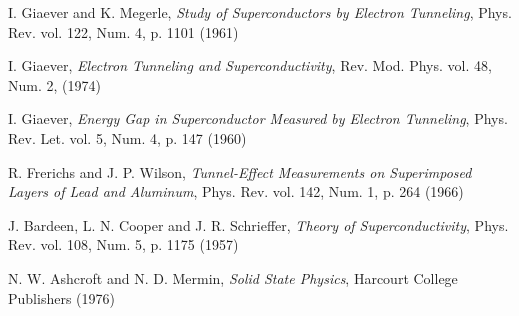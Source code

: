 \documentclass[twocolumn,a4paper,10pt]{article}
\begin{document}
\begin{thebibliography}{99}

 I. Giaever and K. Megerle, \emph{Study of Superconductors by Electron Tunneling}, Phys. Rev. vol. 122, Num. 4, p. 1101 (1961)

 I. Giaever, \emph{Electron Tunneling and Superconductivity}, Rev. Mod. Phys. vol. 48, Num. 2, (1974)

 I. Giaever, \emph{Energy Gap in Superconductor Measured by Electron Tunneling}, Phys. Rev. Let. vol. 5, Num. 4, p. 147 (1960)

 R. Frerichs and J. P. Wilson, \emph{Tunnel-Effect Measurements on Superimposed Layers of Lead and Aluminum}, Phys. Rev. vol. 142, Num. 1, p. 264 (1966)

 J. Bardeen, L. N. Cooper and J. R. Schrieffer, \emph{Theory of Superconductivity}, Phys. Rev. vol. 108, Num. 5, p. 1175 (1957)

 N. W. Ashcroft and N. D. Mermin, \emph{Solid State Physics}, Harcourt College Publishers (1976)

\end{thebibliography}
\end{document}
